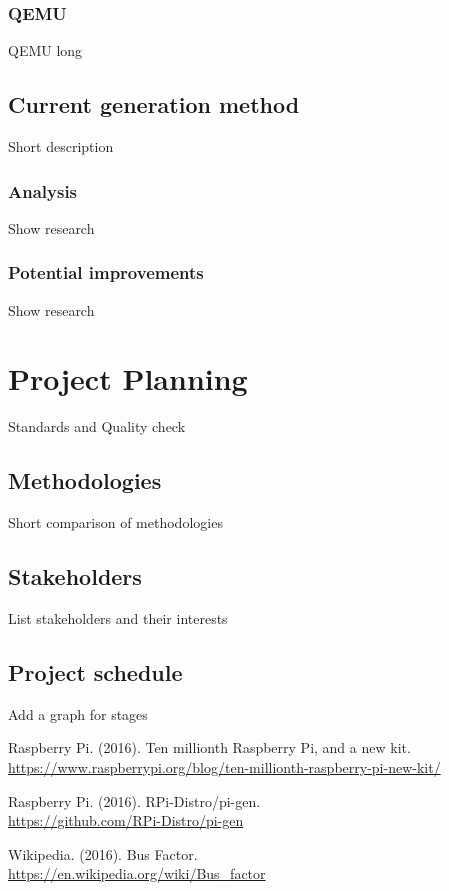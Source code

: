 \documentclass[12pt,a4paper]{report}
\begin{document}
\subsection{QEMU}
QEMU long
\section{Current generation method}
Short description
\subsection{Analysis}
Show research
\subsection{Potential improvements}
Show research

\chapter{Project Planning}

Standards and Quality check
\section{Methodologies}
Short comparison of methodologies
\section{Stakeholders}
List stakeholders and their interests
\section{Project schedule}
Add a graph for stages



\begin{thebibliography}{9}

Raspberry Pi. (2016). Ten millionth Raspberry Pi, and a new kit.
\\\url{https://www.raspberrypi.org/blog/ten-millionth-raspberry-pi-new-kit/}


Raspberry Pi. (2016). RPi-Distro/pi-gen.
\\\url{https://github.com/RPi-Distro/pi-gen}

Wikipedia. (2016). Bus Factor.
\\\url{https://en.wikipedia.org/wiki/Bus_factor}

\end{thebibliography}
\end{document}
